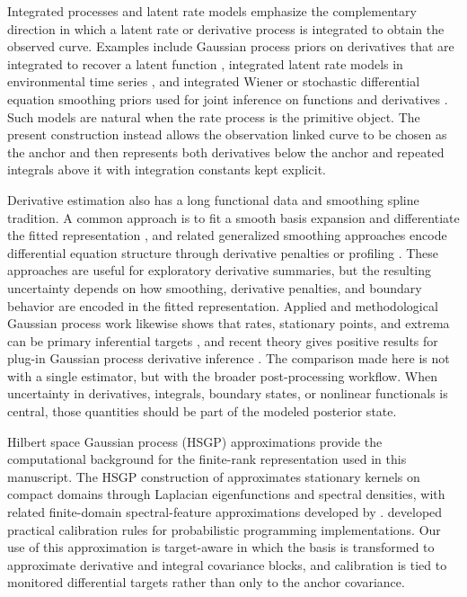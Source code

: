 \documentclass[11pt,a4paper]{article}
\theoremstyle{definition}
\theoremstyle{remark}
\begin{document}
Integrated processes and latent rate models emphasize the complementary direction in which a latent rate or derivative process is integrated to obtain the observed curve.  Examples include Gaussian process priors on derivatives that are integrated to recover a latent function \citep{holsclaw2013gaussian}, integrated latent rate models in environmental time series \citep{cahill2015modeling}, and integrated Wiener or stochastic differential equation smoothing priors used for joint inference on functions and derivatives \citep{yue2014bayesian,zhang2024model}.  Such models are natural when the rate process is the primitive object.  The present construction instead allows the observation linked curve to be chosen as the anchor and then represents both derivatives below the anchor and repeated integrals above it with integration constants kept explicit.

Derivative estimation also has a long functional data and smoothing spline tradition. A common approach is to fit a smooth basis expansion and differentiate the fitted representation \citep{silverman1985spline,ramsay2005functional}, and related generalized smoothing approaches encode differential equation structure through derivative penalties or profiling \citep{ramsay2007parameter}. These approaches are useful for exploratory derivative summaries, but the resulting uncertainty depends on how smoothing, derivative penalties, and boundary behavior are encoded in the fitted representation. Applied and methodological Gaussian process work likewise shows that rates, stationary points, and extrema can be primary inferential targets \citep{swain2016inferring,yu2023bayesian,li2024semiparametric}, and recent theory gives positive results for plug-in Gaussian process derivative inference \citep{liu2026optimal}. The comparison made here is not with a single estimator, but with the broader post-processing workflow. When uncertainty in derivatives, integrals, boundary states, or nonlinear functionals is central, those quantities should be part of the modeled posterior state.

Hilbert space Gaussian process (HSGP) approximations provide the computational background for the finite-rank representation used in this manuscript.  The HSGP construction of \citet{solin2020hilbert} approximates stationary kernels on compact domains through Laplacian eigenfunctions and spectral densities, with related finite-domain spectral-feature approximations developed by \citet{hensman2018variational}.   developed practical calibration rules for probabilistic programming implementations.  Our use of this approximation is target-aware in which the basis is transformed to approximate derivative and integral covariance blocks, and calibration is tied to monitored differential targets rather than only to the anchor covariance.
\end{document}
